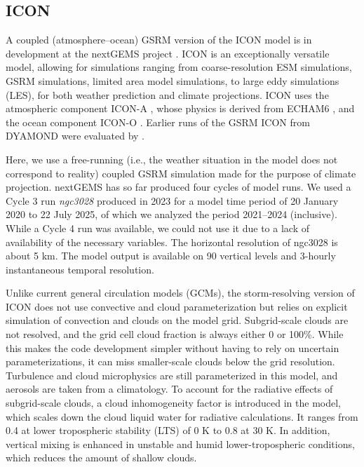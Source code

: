 \documentclass[draft]{agujournal2019}
\begin{document}
\subsection{ICON}
\label{sec:icon}

A coupled (atmosphere--ocean) GSRM version of the ICON model is in development at the nextGEMS project . ICON is an exceptionally versatile model, allowing for simulations ranging from coarse-resolution ESM simulations, GSRM simulations, limited area model simulations, to large eddy simulations (LES), for both weather prediction and climate projections. ICON uses the atmospheric component ICON-A , whose physics is derived from ECHAM6 , and the ocean component ICON-O . Earlier runs of the GSRM ICON from DYAMOND were evaluated by .

Here, we use a free-running (i.e., the weather situation in the model does not correspond to reality) coupled GSRM simulation made for the purpose of climate projection. nextGEMS has so far produced four cycles of model runs. We used a Cycle 3 run \emph{ngc3028} produced in 2023  for a model time period of 20 January 2020 to 22 July 2025, of which we analyzed the period 2021--2024 (inclusive). While a Cycle 4 run was available, we could not use it due to a lack of availability of the necessary variables. The horizontal resolution of ngc3028 is about 5 km. The model output is available on 90 vertical levels and 3-hourly instantaneous temporal resolution.

Unlike current general circulation models (GCMs), the storm-resolving version of ICON does not use convective and cloud parameterization but relies on explicit simulation of convection and clouds on the model grid. Subgrid-scale clouds are not resolved, and the grid cell cloud fraction is always either 0 or 100\%. While this makes the code development simpler without having to rely on uncertain parameterizations, it can miss smaller-scale clouds below the grid resolution. Turbulence and cloud microphysics are still parameterized in this model, and aerosols are taken from a climatology. To account for the radiative effects of subgrid-scale clouds, a cloud inhomogeneity factor is introduced in the model, which scales down the cloud liquid water for radiative calculations. It ranges from 0.4 at lower tropospheric stability (LTS) of 0 K to 0.8 at 30 K. In addition, vertical mixing is enhanced in unstable and humid lower-tropospheric conditions, which reduces the amount of shallow clouds.
\end{document}
